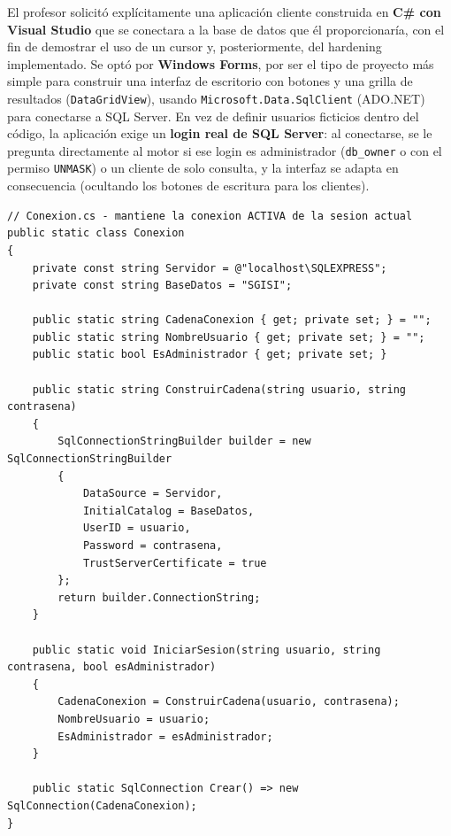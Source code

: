 \documentclass[11pt,a4paper]{article}
\begin{document}
El profesor solicitó explícitamente una aplicación cliente construida en \textbf{C\#
con Visual Studio} que se conectara a la base de datos que él proporcionaría, con el
fin de demostrar el uso de un cursor y, posteriormente, del hardening implementado.
Se optó por \textbf{Windows Forms}, por ser el tipo de proyecto más simple para
construir una interfaz de escritorio con botones y una grilla de resultados
(\texttt{DataGridView}), usando \texttt{Microsoft.Data.SqlClient} (ADO.NET) para
conectarse a SQL Server. En vez de definir usuarios ficticios dentro del código, la
aplicación exige un \textbf{login real de SQL Server}: al conectarse, se le pregunta
directamente al motor si ese login es administrador (\texttt{db\_owner} o con el
permiso \texttt{UNMASK}) o un cliente de solo consulta, y la interfaz se adapta en
consecuencia (ocultando los botones de escritura para los clientes).

\begin{lstlisting}[style=codestyle]
// Conexion.cs - mantiene la conexion ACTIVA de la sesion actual
public static class Conexion
{
    private const string Servidor = @"localhost\SQLEXPRESS";
    private const string BaseDatos = "SGISI";

    public static string CadenaConexion { get; private set; } = "";
    public static string NombreUsuario { get; private set; } = "";
    public static bool EsAdministrador { get; private set; }

    public static string ConstruirCadena(string usuario, string contrasena)
    {
        SqlConnectionStringBuilder builder = new SqlConnectionStringBuilder
        {
            DataSource = Servidor,
            InitialCatalog = BaseDatos,
            UserID = usuario,
            Password = contrasena,
            TrustServerCertificate = true
        };
        return builder.ConnectionString;
    }

    public static void IniciarSesion(string usuario, string contrasena, bool esAdministrador)
    {
        CadenaConexion = ConstruirCadena(usuario, contrasena);
        NombreUsuario = usuario;
        EsAdministrador = esAdministrador;
    }

    public static SqlConnection Crear() => new SqlConnection(CadenaConexion);
}
\end{lstlisting}
\end{document}
